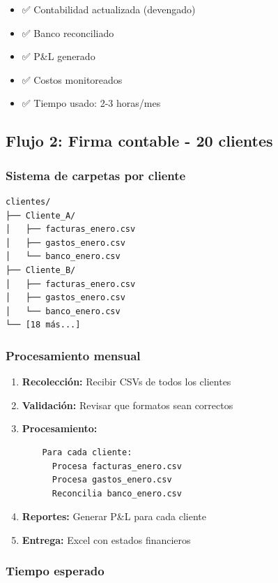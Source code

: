 \documentclass[12pt,oneside]{article}
\begin{document}
\begin{itemize}
    \item ✅ Contabilidad actualizada (devengado)
    \item ✅ Banco reconciliado
    \item ✅ P\&L generado
    \item ✅ Costos monitoreados
    \item ✅ Tiempo usado: 2-3 horas/mes
\end{itemize}

\subsection{Flujo 2: Firma contable - 20 clientes}

\subsubsection{Sistema de carpetas por cliente}

\begin{verbatim}
clientes/
├── Cliente_A/
│   ├── facturas_enero.csv
│   ├── gastos_enero.csv
│   └── banco_enero.csv
├── Cliente_B/
│   ├── facturas_enero.csv
│   ├── gastos_enero.csv
│   └── banco_enero.csv
└── [18 más...]
\end{verbatim}

\subsubsection{Procesamiento mensual}

\begin{enumerate}
    \item \textbf{Recolección:} Recibir CSVs de todos los clientes
    \item \textbf{Validación:} Revisar que formatos sean correctos
    \item \textbf{Procesamiento:} 
    \begin{verbatim}
    Para cada cliente:
      Procesa facturas_enero.csv
      Procesa gastos_enero.csv
      Reconcilia banco_enero.csv
    \end{verbatim}
    \item \textbf{Reportes:} Generar P\&L para cada cliente
    \item \textbf{Entrega:} Excel con estados financieros
\end{enumerate}

\subsubsection{Tiempo esperado}
\end{document}

